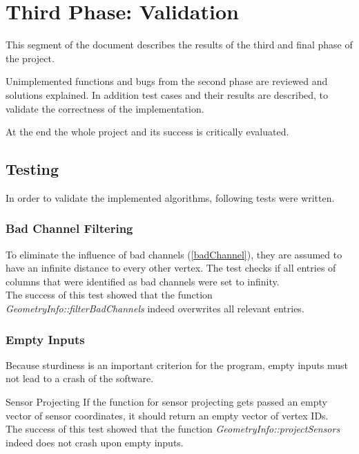 \section{Third Phase: Validation}
This segment of the document describes the results of the third and final phase of the project.

Unimplemented functions and bugs from the second phase are reviewed and solutions explained. 
In addition test cases and their results are described, to validate the correctness of the implementation.

At the end the whole project and its success is critically evaluated.

\clearpage
\subsection{Testing}

In order to validate the implemented algorithms, following tests were written.

\subsubsection{Bad Channel Filtering}

To eliminate the influence of bad channels (\ref{badChannel}), they are assumed to have an infinite distance to every other vertex. The test checks if all entries of columns that were identified as bad channels were set to infinity.\\
The success of this test showed that the function \textit{GeometryInfo::filterBadChannels} indeed overwrites all relevant entries.

\subsubsection{Empty Inputs}

Because sturdiness is an important criterion for the program, empty inputs must not lead to a crash of the software.

\begin{aims}
	\item[\hspace*{11mm} Sensor Projecting] If the function for sensor projecting gets passed an empty vector of sensor coordinates, it should return an empty vector of vertex IDs. \\
	The success of this test showed that the function \textit{GeometryInfo::projectSensors} indeed does not crash upon empty inputs.
\end{aims}

